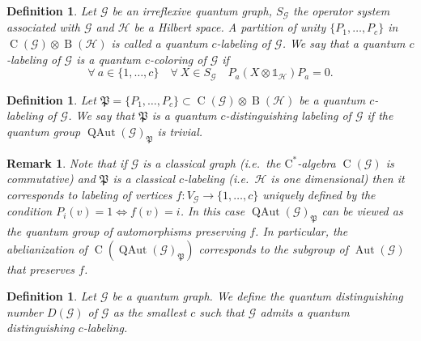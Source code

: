 \documentclass[11pt,reqno]{amsart}
\newtheorem{definition}[proposition]{Definition}
\newtheorem{remark}[proposition]{Remark}
\newcommand{\cst}{\ensuremath{\mathrm{C}^*}}
\newcommand{\I}{\mathds{1}}
\newcommand{\tens}{\otimes}
\DeclareMathOperator{\Aut}{Aut}
\DeclareMathOperator{\QAut}{QAut}
\DeclareMathOperator{\B}{B}
\DeclareMathOperator{\C}{C}
\begin{document}
\begin{definition}
Let $\mathcal{G}$ be an irreflexive quantum graph, $S_{\scriptscriptstyle\mathcal{G}}$ the operator system associated with $\mathcal{G}$ and $\mathscr{H}$ be a Hilbert space. A partition of unity $\{P_1,\dotsc,P_c\}$ in $\C(\mathcal{G})\tens\B(\mathscr{H})$ is called a \emph{quantum $c$-labeling of $\mathcal{G}$}. We say that a quantum $c$-labeling of $\mathcal{G}$ is a \emph{quantum $c$-coloring of $\mathcal{G}$} if
\[
\forall\:a\in\{1,\dotsc,c\}\quad\forall\:X\in S_{\scriptscriptstyle\mathcal{G}}\quad P_a(X\tens\I_\mathcal{\mathscr{H}})P_a=0.
\]
\end{definition}

\begin{definition}
Let $\mathfrak{P}=\{P_1,\dotsc,P_c\}\subset\C(\mathcal{G})\tens\B(\mathscr{H})$ be a quantum $c$-labeling of $\mathcal{G}$. We say that $\mathfrak{P}$ is a \emph{quantum $c$-distinguishing labeling} of $\mathcal{G}$ if the quantum group $\QAut(\mathcal{G})_{\mathfrak{P}}$ is trivial.
\end{definition}
\begin{remark}
Note that if $\mathcal{G}$ is a classical graph (i.e.~the \cst-algebra $\C(\mathcal{G})$ is commutative) and $\mathfrak{P}$ is a classical $c$-labeling (i.e.~$\mathscr{H}$ is one dimensional) then it corresponds to labeling of vertices $f\colon{V_\mathcal{G}}\to\{1,\dotsc,c\}$ uniquely defined by the condition $P_i(v)=1\Leftrightarrow{f(v)}=i$. In this case $\QAut(\mathcal{G})_{\mathfrak{P}}$ can be viewed as the quantum group of automorphisms preserving $f$. In particular, the abelianization of $\C(\QAut(\mathcal{G})_{\mathfrak{P}})$ corresponds to the subgroup of $\Aut(\mathcal{G})$ that preserves $f$.
\end{remark}

\begin{definition}
Let $\mathcal{G}$ be a quantum graph. We define the quantum \emph{distinguishing number} $D(\mathcal{G})$ of $\mathcal{G}$ as the smallest $c$ such that $\mathcal{G}$ admits a quantum distinguishing $c$-labeling.
\end{definition}
\end{document}
